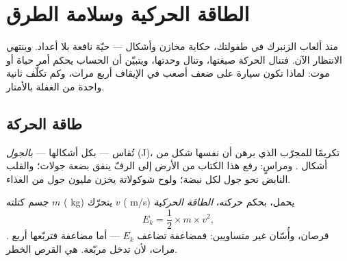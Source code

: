 \chapter{الطاقة الحركية وسلامة الطرق}\label{ch:g9:kinetic-energy-safety}

منذ ألعاب الزنبرك في طفولتك،  حكاية مخازن وأشكال ---
حيّة نافعة بلا أعداد. وينتهي الانتظار الآن. فتنال  الحركة
صيغتها، وتنال  وحدتها، ويتبيّن أن الحساب يحكم أمر حياة
أو موت: لماذا تكون سيارة على ضعف  أصعب في الإيقاف أربع
مرات، وكم تكلّف ثانية واحدة من الغفلة بالأمتار.

\section{طاقة الحركة}

\begin{definition}[الجول]\label{def:g9:kinetic-energy-safety:joule}
تُقاس  --- بكل أشكالها --- \emph{بالجول}
(\unit{J})، تكريمًا للمجرّب الذي برهن أن  نفسها شكل من
أشكال . ومراسٍ: رفع هذا الكتاب من الأرض إلى الرفّ ينفق
بضعة جولات؛ والقلب النابض نحو جول لكل نبضة؛ ولوح شوكولاتة يخزن
مليون جول من  الغذاء.
\end{definition}

\begin{proposition}\label{prop:g9:kinetic-energy-safety:formula}
جسم كتلته $m$ ( \unit{kg}) يتحرّك  $v$ (
\unit{m/s}) يحمل، بحكم حركته، \emph{الطاقة
الحركية}
\[
E_k = \frac{1}{2} \times m \times v^2 ,
\]
. قرصان، وأُسّان غير متساويين: فمضاعفة  تضاعف
$E_k$ --- أما مضاعفة \emph{} فتربّعها أربع مرات، لأن
 تدخل مربّعة.  هي القرص الخطر.
\end{proposition}

